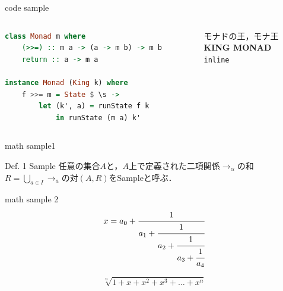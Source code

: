 \documentclass[aspectratio=1610,14pt]{beamer}
\begin{document}
\begin{frame}[fragile]{code sample}
    \begin{columns}
        \begin{column}{0.5\textwidth}
            \begin{lstlisting}[language=Haskell]
class Monad m where 
    (>>=) :: m a -> (a -> m b) -> m b 
    return :: a -> m a

instance Monad (King k) where
    f >>= m = State $ \s ->
        let (k', a) = runState f k
            in runState (m a) k'
            \end{lstlisting}
        \end{column}
        \begin{column}{0.5\textwidth}
            モナドの王，モナ王 \\
            \textbf{KING MONAD}\\
            \lstinline|inline|
        \end{column}
    \end{columns}
\end{frame}


\begin{frame}{math sample1}
    \begin{block}{Def. 1 Sample}
        任意の集合$A$と，$A$上で定義された二項関係$\to_{\alpha}$の和$R = \bigcup_{a \in I} \to_a $の対$(A, R)$をSampleと呼ぶ．
    \end{block}

\end{frame}

\begin{frame}{math sample 2}
  \begin{equation}
    x = a_0 + \cfrac{1}{a_1 
      + \cfrac{1}{a_2 
        + \cfrac{1}{a_3 + \cfrac{1}{a_4} } } }
  \end{equation}

  \[
  \sqrt[n]{1+x+x^2+x^3+\dots+x^n}
  \]
\end{frame}
\end{document}
